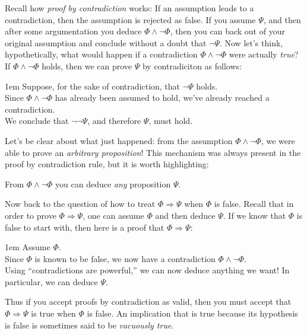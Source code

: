 \documentclass[12pt]{article}
\newcommand{\AND}{\wedge}
\newcommand{\ARR}{\Rightarrow}
\newcounter{rule}
\def\putRuleNumber{\refstepcounter{rule}\therule}
\newcommand{\indented}[1]{\begin{adjustwidth}{1em}{}#1\end{adjustwidth}}
\newcommand{\DRULE}[2]{\begin{tcolorbox}[title=Derived Rule \putRuleNumber: #1,colbacktitle=white,coltitle=black,colback=white]#2\end{tcolorbox}} %
\def\pA{\Phi}
\def\pB{\Psi}
\begin{document}
\def\vsp{\\[0.5em]}

Recall how \emph{proof by contradiction} works:
If an assumption leads to a contradiction, then the assumption is rejected as false.
If you assume $\pB$, and then after some argumentation you deduce $\pA\AND\neg\pA$, then
you can back out of your original assumption and conclude without a doubt that $\neg\pB$.
Now let's think, hypothetically, what would happen if a contradiction $\pA\AND\neg\pA$ were actually \emph{true}?
If $\pA\AND\neg\pA$ holds, then we can prove $\pB$ by contradiciton as follows:
\indented{
Suppose, for the sake of contradiction, that $\neg\pB$ holds.\vsp
Since $\pA\AND\neg\pA$ has already been assumed to hold, we've already reached a contradiction.\vsp
We conclude that $\neg\neg\pB$, and therefore $\pB$, must hold.
}
Let's be clear about what just happened: from the assumption $\pA\AND\neg\pA$, we were able to prove an \emph{arbitrary proposition}!
This mechanism was always present in the proof by contradiction rule, but it is worth highlighting:

\DRULE{\label{rule:contradictions}Contradictions are powerful!}{
From $\pA\AND\neg\pA$ you can deduce \emph{any} proposition $\pB$.
}

Now back to the question of how to treat $\pA\ARR\pB$ when $\pA$ is false.
Recall that in order to prove $\pA\ARR\pB$, one can assume $\pA$ and then deduce $\pB$.
If we know that $\pA$ is false to start with, then here is a proof that $\pA\ARR\pB$:
\indented{
Assume $\pA$.\vsp
Since $\pA$ is known to be false, we now have a contradiction $\pA\AND\neg\pA$.\vsp
Using ``contradictions are powerful,'' we can now deduce anything we want! In particular, we can deduce $\pB$.
}
Thus if you accept proofs by contradiction as valid, then you must accept that $\pA\ARR\pB$ is true when $\pA$ is false.
An implication that is true because its hypothesis is false is sometimes said to be \emph{vacuously true}.
\end{document}
